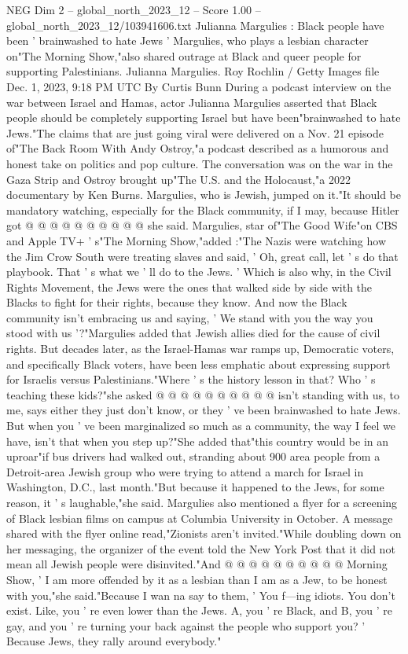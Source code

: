 \begin{textsample}{NEG Dim 2 – global\_north\_2023\_12 – Score 1.00 – global\_north\_2023\_12/103941606.txt}  \label{ex:f2_neg_332}
Julianna Margulies : Black people have been ' brainwashed to hate Jews ' Margulies, who plays a lesbian character on"The Morning Show,"also shared outrage at Black and queer people for supporting Palestinians.
Julianna Margulies.
Roy Rochlin / Getty Images file Dec. 1, 2023, 9:18 PM UTC By Curtis Bunn During a podcast interview on the war between Israel and Hamas, actor Julianna Margulies asserted that Black people should be completely supporting Israel but have been"brainwashed to hate Jews."The claims that are just going viral were delivered on a Nov. 21 episode of"The Back Room With Andy Ostroy,"a podcast described as a humorous and honest take on politics and pop culture.
The conversation was on the war in the Gaza Strip and Ostroy brought up"The U.S. and the Holocaust,"a 2022 documentary by Ken Burns.
Margulies, who is Jewish, jumped on it."It should be mandatory watching, especially for the Black community, if I may, because Hitler got @ @ @ @ @ @ @ @ @ @ she said.
Margulies, star of"The Good Wife"on CBS and Apple TV+ ' s"The Morning Show,"added :"The Nazis were watching how the Jim Crow South were treating slaves and said, ' Oh, great call, let ' s do that playbook.
That ' s what we ' ll do to the Jews. ' Which is also why, in the Civil Rights Movement, the Jews were the ones that walked side by side with the Blacks to fight for their rights, because they know.
And now the Black community isn't embracing us and saying, ' We stand with you the way you stood with us '?"Margulies added that Jewish allies died for the cause of civil rights.
But decades later, as the Israel-Hamas war ramps up, Democratic voters, and specifically Black voters, have been less emphatic about expressing support for Israelis versus Palestinians."Where ' s the history lesson in that?
Who ' s teaching these kids?"she asked @ @ @ @ @ @ @ @ @ @ isn't standing with us, to me, says either they just don't know, or they ' ve been brainwashed to hate Jews.
But when you ' ve been marginalized so much as a community, the way I feel we have, isn't that when you step up?"She added that"this country would be in an uproar"if bus drivers had walked out, stranding about 900 area people from a Detroit-area Jewish group who were trying to attend a march for Israel in Washington, D.C., last month."But because it happened to the Jews, for some reason, it ' s laughable,"she said.
Margulies also mentioned a flyer for a screening of Black lesbian films on campus at Columbia University in October.
A message shared with the flyer online read,"Zionists aren't invited."While doubling down on her messaging, the organizer of the event told the New York Post that it did not mean all Jewish people were disinvited."And @ @ @ @ @ @ @ @ @ @ Morning Show, ' I am more offended by it as a lesbian than I am as a Jew, to be honest with you,"she said."Because I wan na say to them, ' You f---ing idiots.
You don't exist.
Like, you ' re even lower than the Jews.
A, you ' re Black, and B, you ' re gay, and you ' re turning your back against the people who support you? ' Because Jews, they rally around everybody."

\end{textsample}

